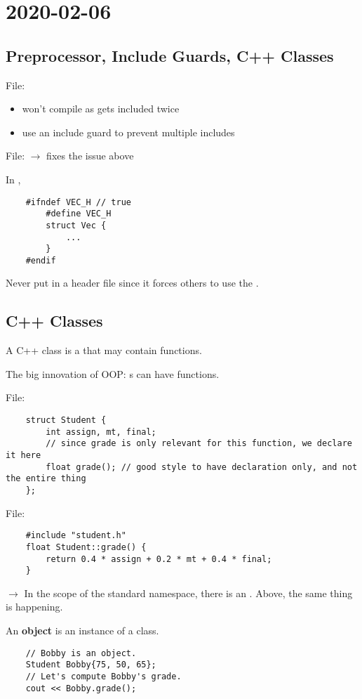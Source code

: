 \section{2020-02-06}
\subsection{Preprocessor, Include Guards, C++ Classes}
File: 
\begin{itemize}
    \item won't compile as  gets included twice
    \item use an include guard to prevent multiple includes
\end{itemize}
File:  $ \rightarrow $ fixes the issue above

In ,
\begin{lstlisting}
    #ifndef VEC_H // true
        #define VEC_H
        struct Vec {
            ...
        }
    #endif
\end{lstlisting}
Never put  in a header file since it forces
others to use the .

\subsection{C++ Classes}
A C++ class is a  that may contain functions.

The big innovation of OOP: s can have functions.

File: 
\begin{lstlisting}
    struct Student {
        int assign, mt, final;
        // since grade is only relevant for this function, we declare it here
        float grade(); // good style to have declaration only, and not the entire thing
    };
\end{lstlisting}

File: 
\begin{lstlisting}
    #include "student.h"
    float Student::grade() {
        return 0.4 * assign + 0.2 * mt + 0.4 * final;
    }
\end{lstlisting}
 $ \rightarrow $ 
In the scope of the standard namespace, there is an .
Above, the same thing is happening.

An \textbf{object} is an instance of a class.
\begin{lstlisting}
    // Bobby is an object.
    Student Bobby{75, 50, 65};
    // Let's compute Bobby's grade.
    cout << Bobby.grade();
\end{lstlisting}


